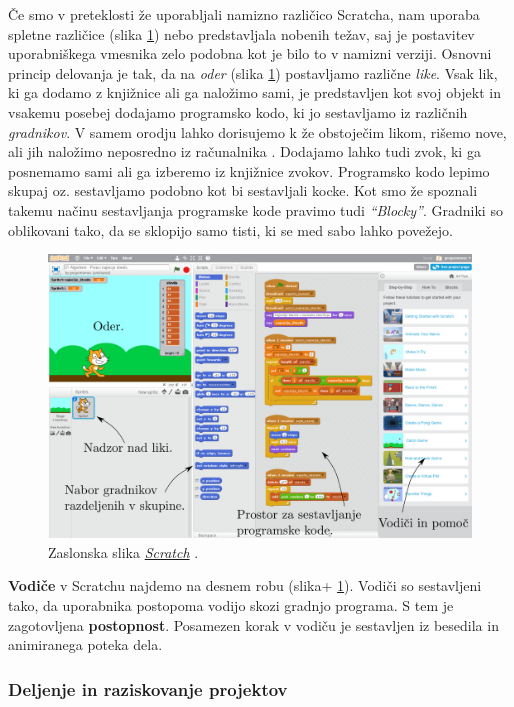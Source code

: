 Če smo v preteklosti že uporabljali namizno različico Scratcha, nam
uporaba spletne različice (slika \ref{fig:web:scratch:orodje}) nebo
predstavljala nobenih težav, saj je postavitev uporabniškega vmesnika
zelo podobna kot je bilo to v namizni verziji. Osnovni princip
delovanja je tak, da na \emph{oder} (slika
\ref{fig:web:scratch:orodje}) postavljamo različne \emph{like}. Vsak
lik, ki ga dodamo z knjižnice ali ga naložimo sami, je predstavljen
kot svoj objekt in vsakemu posebej dodajamo programsko kodo, ki jo
sestavljamo iz različnih \emph{gradnikov}. V samem orodju lahko
dorisujemo k že obstoječim likom, rišemo nove, ali jih naložimo
neposredno iz računalnika . Dodajamo lahko tudi zvok, ki ga posnemamo
sami ali ga izberemo iz knjižnice zvokov. Programsko kodo lepimo
skupaj oz. sestavljamo podobno kot bi sestavljali kocke. Kot smo že
spoznali takemu načinu sestavljanja programske kode pravimo tudi
\emph{``Blocky''}. Gradniki so oblikovani tako, da se sklopijo samo
tisti, ki se med sabo lahko povežejo.

\begin{figure}[h!]
  \centering
    \includegraphics [width=0.90\linewidth, keepaspectratio =
   1] {./images/sc_web/scratch_orodje-v021.jpg}
   \caption{Zaslonska slika
     \emph{\href{https://scratch.mit.edu/}{Scratch}}
     \cite{web:scratch}.}
    \label{fig:web:scratch:orodje}
\end{figure}

\textbf{Vodiče} v Scratchu najdemo na desnem robu (slika+
\ref{fig:web:scratch:orodje}). Vodiči so sestavljeni tako, da
uporabnika postopoma vodijo skozi gradnjo programa. S tem je
zagotovljena \textbf{postopnost}. Posamezen korak v vodiču je
sestavljen iz besedila in animiranega poteka dela.

\subsubsection{Deljenje in raziskovanje projektov}
\label{sec:deljenje_vsebin}


